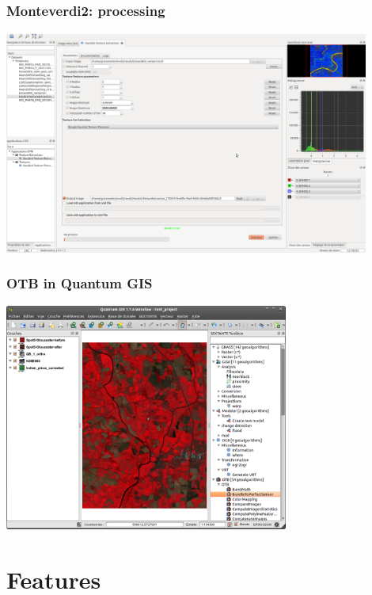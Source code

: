 \documentclass[8pt]{beamer}
\begin{document}
\begin{frame}
\frametitle{Monteverdi2: processing}
\begin{minipage}[t][6cm][t]{\textwidth}
\begin{center}
\includegraphics[width=0.9\textwidth]{images/monteverdi2-haralick.png}
\end{center}
\end{minipage}
\end{frame}

\begin{frame}
\frametitle{OTB in Quantum GIS}
\begin{minipage}[t][6cm][t]{\textwidth}
\begin{center}
\includegraphics[width=0.7\textwidth]{images/otb_qgis.png}
\end{center}
\end{minipage}
\end{frame}

\section{Features}
\end{document}
